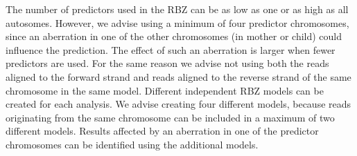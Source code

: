 The number of predictors used in the RBZ can be as low as one or as high as all autosomes. 
However, we advise using a minimum of four predictor chromosomes, since an aberration in one of the other chromosomes (in mother or child) could influence the prediction. 
The effect of such an aberration is larger when fewer predictors are used. 
For the same reason we advise not using both the reads aligned to the forward strand and reads aligned to the reverse strand of the same chromosome in the same model.
Different independent RBZ models can be created for each analysis. 
We advise creating four different models, because reads originating from the same chromosome can be included in a maximum of two different models. Results affected by an aberration in one of the predictor chromosomes can be identified using the additional models.